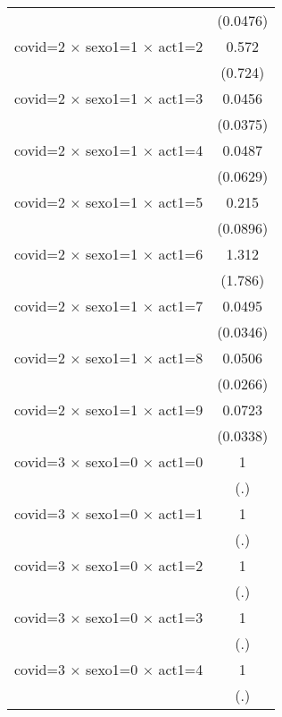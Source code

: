 {\begin{tabular}{l*{1}{c}}
                    &    (0.0476)         \\
[1em]
covid=2 $\times$ sexo1=1 $\times$ act1=2&       0.572         \\
                    &     (0.724)         \\
[1em]
covid=2 $\times$ sexo1=1 $\times$ act1=3&      0.0456\sym{***}\\
                    &    (0.0375)         \\
[1em]
covid=2 $\times$ sexo1=1 $\times$ act1=4&      0.0487\sym{*}  \\
                    &    (0.0629)         \\
[1em]
covid=2 $\times$ sexo1=1 $\times$ act1=5&       0.215\sym{***}\\
                    &    (0.0896)         \\
[1em]
covid=2 $\times$ sexo1=1 $\times$ act1=6&       1.312         \\
                    &     (1.786)         \\
[1em]
covid=2 $\times$ sexo1=1 $\times$ act1=7&      0.0495\sym{***}\\
                    &    (0.0346)         \\
[1em]
covid=2 $\times$ sexo1=1 $\times$ act1=8&      0.0506\sym{***}\\
                    &    (0.0266)         \\
[1em]
covid=2 $\times$ sexo1=1 $\times$ act1=9&      0.0723\sym{***}\\
                    &    (0.0338)         \\
[1em]
covid=3 $\times$ sexo1=0 $\times$ act1=0&           1         \\
                    &         (.)         \\
[1em]
covid=3 $\times$ sexo1=0 $\times$ act1=1&           1         \\
                    &         (.)         \\
[1em]
covid=3 $\times$ sexo1=0 $\times$ act1=2&           1         \\
                    &         (.)         \\
[1em]
covid=3 $\times$ sexo1=0 $\times$ act1=3&           1         \\
                    &         (.)         \\
[1em]
covid=3 $\times$ sexo1=0 $\times$ act1=4&           1         \\
                    &         (.)         \\

\end{tabular}}
